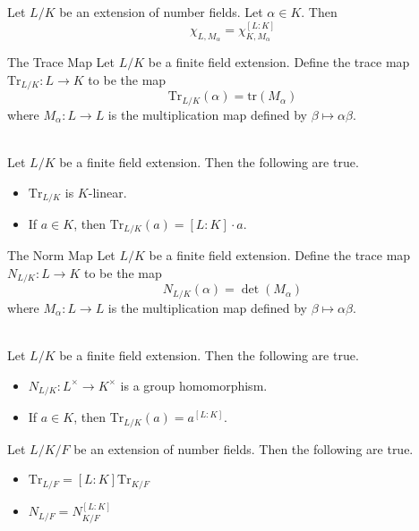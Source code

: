 \documentclass[a4paper]{article}
\begin{document}
\begin{prp}{}{} Let $L/K$ be an extension of number fields. Let $\alpha\in K$. Then $$\chi_{L,M_\alpha}=\chi_{K,M_\alpha}^{[L:K]}$$
\end{prp}

\begin{defn}{The Trace Map}{} Let $L/K$ be a finite field extension. Define the trace map $\text{Tr}_{L/K}:L\to K$ to be the map $$\text{Tr}_{L/K}(\alpha)=\text{tr}(M_\alpha)$$ where $M_\alpha:L\to L$ is the multiplication map defined by $\beta\mapsto\alpha\beta$. 
\end{defn}

\begin{lmm}{}{}\\
Let $L/K$ be a finite field extension. Then the following are true. 
\begin{itemize}
\item $\text{Tr}_{L/K}$ is $K$-linear. 
\item If $a\in K$, then $\text{Tr}_{L/K}(a)=[L:K]\cdot a$. 
\end{itemize}
\end{lmm}

\begin{defn}{The Norm Map}{} Let $L/K$ be a finite field extension. Define the trace map $N_{L/K}:L\to K$ to be the map $$N_{L/K}(\alpha)=\det(M_\alpha)$$ where $M_\alpha:L\to L$ is the multiplication map defined by $\beta\mapsto\alpha\beta$. 
\end{defn}

\begin{lmm}{}{}\\
Let $L/K$ be a finite field extension. Then the following are true. 
\begin{itemize}
\item $N_{L/K}:L^\times\to K^\times$ is a group homomorphism. 
\item If $a\in K$, then $\text{Tr}_{L/K}(a)=a^{[L:K]}$. 
\end{itemize}
\end{lmm}

\begin{crl}{}{} Let $L/K/F$ be an extension of number fields. Then the following are true. 
\begin{itemize}
\item $\text{Tr}_{L/F}=[L:K]\text{Tr}_{K/F}$
\item $N_{L/F}=N_{K/F}^{[L:K]}$
\end{itemize}
\end{crl}
\end{document}

